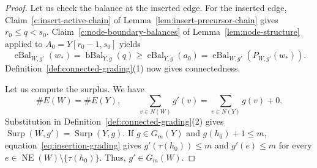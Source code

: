 \begin{proof}
Let us check the balance at the inserted edge.
For the inserted edge, Claim~\ref{c:insert-active-chain} of Lemma~\ref{lem:insert-precursor-chain} gives $r_0\le q<s_0$. Claim~\ref{c:node-boundary-balances} of Lemma~\ref{lem:node-structure} applied to $A_0=Y[r_0-1,s_0]$ yields
\[
 \operatorname{eBal}_{W,g'}(w_*)
 =\operatorname{bBal}_{Y,g}(q)
 \ge\operatorname{eBal}_{Y,g}(a_0)
 =\operatorname{eBal}_{W,g'}(P_{W,g'}(w_*)).
\]
Definition~\ref{def:connected-grading}(1) now gives connectedness.

Let us compute the surplus. We have
\[
 \#E(W)=\#E(Y),\qquad
 \sum_{v\in N(W)}g'(v)=\sum_{v\in N(Y)}g(v)+0.
\]
Substitution in Definition~\ref{def:connected-grading}(2) gives $\operatorname{Surp}(W,g')=\operatorname{Surp}(Y,g)$. If $g\in G_m(Y)$ and $g(h_0)+1\le m$, equation~\eqref{eq:insertion-grading} gives $g'(\tau(h_0))\le m$ and $g'(e)\le m$ for every $e\in\operatorname{NE}(W)\setminus\{\tau(h_0)\}$. Thus, $g'\in G_m(W)$.
\end{proof}


